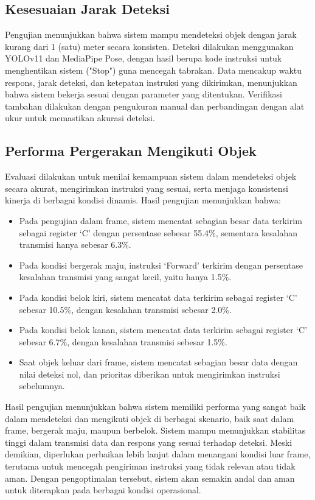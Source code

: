 \subsection{Kesesuaian Jarak Deteksi}
\label{sec:kesesuaianjarak}

Pengujian menunjukkan bahwa sistem mampu mendeteksi objek dengan jarak kurang dari 1 (satu) meter secara konsisten. Deteksi dilakukan menggunakan YOLOv11 dan MediaPipe Pose, dengan hasil berupa kode instruksi untuk menghentikan sistem ("Stop") guna mencegah tabrakan. Data mencakup waktu respons, jarak deteksi, dan ketepatan instruksi yang dikirimkan, menunjukkan bahwa sistem bekerja sesuai dengan parameter yang ditentukan. Verifikasi tambahan dilakukan dengan pengukuran manual dan perbandingan dengan alat ukur untuk memastikan akurasi deteksi.

\subsection{Performa Pergerakan Mengikuti Objek}
\label{sec:akurasiikutiobjek}

Evaluasi dilakukan untuk menilai kemampuan sistem dalam mendeteksi objek secara akurat, mengirimkan instruksi yang sesuai, serta menjaga konsistensi kinerja di berbagai kondisi dinamis. Hasil pengujian menunjukkan bahwa:

\begin{itemize}
    \item Pada pengujian dalam frame, sistem mencatat sebagian besar data terkirim sebagai register ‘C’ dengan persentase sebesar 55.4\%, sementara kesalahan transmisi hanya sebesar 6.3\%.
    \item Pada kondisi bergerak maju, instruksi ‘Forward’ terkirim dengan persentase kesalahan transmisi yang sangat kecil, yaitu hanya 1.5\%.
    \item Pada kondisi belok kiri, sistem mencatat data terkirim sebagai register ‘C’ sebesar 10.5\%, dengan kesalahan transmisi sebesar 2.0\%.
    \item Pada kondisi belok kanan, sistem mencatat data terkirim sebagai register ‘C’ sebesar 6.7\%, dengan kesalahan transmisi sebesar 1.5\%.
    \item Saat objek keluar dari frame, sistem mencatat sebagian besar data dengan nilai deteksi nol, dan prioritas diberikan untuk mengirimkan instruksi sebelumnya.
\end{itemize}

Hasil pengujian menunjukkan bahwa sistem memiliki performa yang sangat baik dalam mendeteksi dan mengikuti objek di berbagai skenario, baik saat dalam frame, bergerak maju, maupun berbelok. Sistem mampu menunjukkan stabilitas tinggi dalam transmisi data dan respons yang sesuai terhadap deteksi. Meski demikian, diperlukan perbaikan lebih lanjut dalam menangani kondisi luar frame, terutama untuk mencegah pengiriman instruksi yang tidak relevan atau tidak aman. Dengan pengoptimalan tersebut, sistem akan semakin andal dan aman untuk diterapkan pada berbagai kondisi operasional.

